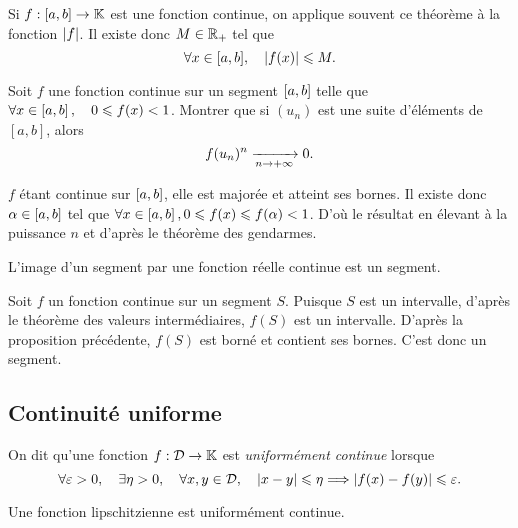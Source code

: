 \documentclass{magnolia}
\begin{document}
\begin{remarqueUnique}
\remarque Si $f:[a,b]\to\mathbb{K}$ est une fonction continue, on applique souvent ce théorème à la fonction $\left|f\right|$. Il existe donc $M\in\mathbb{R}_+$ tel que
\[\forall x\in[a,b],\quad \left|f(x)\right|\leqslant M.\]
\end{remarqueUnique}

\begin{exoUnique}
\exo Soit $f$ une fonction continue sur un segment $\left[a,b\right]$ telle
  que $\forall x\in\left[a,b\right] ,\quad 0\leqslant f(x)<1$. Montrer que si
  $(u_n)$ est une suite d'éléments de $[a,b]$, alors
  \[f(u_n)^n\xrightarrow[n\rightarrow +\infty]{} 0.\]
  \begin{sol}
  $f$ étant continue sur $\left[a,b\right]$, elle est majorée et atteint ses bornes. Il existe donc $\alpha\in \left[a,b\right]$ tel que $\forall x \in \left[a,b\right], 0\leqslant f(x)\leqslant f(\alpha)<1$. D'où le résultat en élevant à la puissance $n$ et d'après le théorème des gendarmes.
  \end{sol}
\end{exoUnique}


 
\begin{proposition}[utile=-3]
L'image d'un segment par une fonction réelle continue est un segment.
\end{proposition}

\begin{preuve}
Soit $f$ un fonction continue sur un segment $S$. Puisque $S$ est un
intervalle, d'après le théorème des valeurs intermédiaires, $f(S)$ est
un intervalle. D'après la proposition précédente, $f(S)$ est borné et contient
ses bornes. C'est donc un segment.
\end{preuve}

\subsection{Continuité uniforme}

\begin{definition}[utile=-3]
On dit qu'une fonction $f:\mathcal{D}\to\mathbb{K}$ est \emph{uniformément continue} lorsque
\[\forall \varepsilon>0 ,\quad \exists \eta>0 ,\quad \forall x,y\in\mathcal{D},\quad
  \left|x-y\right|\leqslant\eta \Longrightarrow \left|f(x)-f(y)\right|\leqslant\varepsilon.\]
\end{definition}

\begin{remarqueUnique}
\remarque Une fonction lipschitzienne est uniformément continue.
\end{remarqueUnique}
\end{document}

